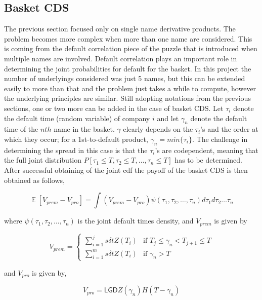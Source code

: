 \documentclass[a4paper,12pt]{article}
\DeclareMathOperator*{\E}{\mathbb{E}}
\begin{document}
\subsection{Basket CDS}
The previous section focused only on single name derivative products. The problem becomes more complex when more than one name are considered. This is coming from the default correlation piece of the puzzle that is introduced when multiple names are involved. Default correlation plays an important role in determining the joint probabilities for default for the basket. In this project the number of underlyings considered was just 5 names, but this can be extended easily to more than that and the problem just takes a while to compute, however the underlying principles are similar. Still adopting notations from the previous sections, one or two more can be added in the case of basket CDS. Let $\tau_i$ denote the default time (random variable) of company $i$ and let $\gamma_n$ denote the default time of the $nth$ name in the basket. $\gamma$ clearly depends on the $\tau_i$'s and the order at which they occur; for a 1st-to-default product, $\gamma_n = min\{\tau_i\}$. The challenge in determining the spread in this case is that the $\tau_i$'s are codependent, meaning that the full joint distribution $P[\tau_1 \leq T, \tau_2 \leq T, \dots, \tau_n \leq T]$ has to be determined. After successful obtaining of the joint cdf the payoff of the basket CDS is then obtained as follows,

\begin{equation}
\E[V_{prem} - V_{pro}] = \int\left(V_{prem} - V_{pro}\right)\psi (\tau_1, \tau_2, \dots, \tau_n)d\tau_1d\tau_2\dots\tau_n
\end{equation}

where $\psi (\tau_1, \tau_2, \dots, \tau_n)$ is the joint default times density, and $V_{prem}$ is given by 

\begin{equation}
V_{prem} = 
\begin{cases} 
\sum\limits_{i = 1}^{j}s\delta t Z(T_i) & \text{if } T_j \leq \gamma_n < T_{j + 1} \leq T \\
\sum\limits_{i = 1}^{m}s\delta t Z(T_i) &  \text{if } \gamma_n > T
\end{cases}
\end{equation}

and $V_{pro}$  is given by, 

\begin{equation}
V_{pro} = \mathsf{LGD}Z(\gamma_n)H(T - \gamma_n)
\end{equation}
\end{document}

